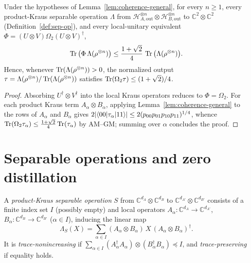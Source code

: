 \begin{theorem}
\label{thm:overlap-criterion}
\leanok
{}
Under the hypotheses of Lemma~\ref{lem:coherence-general}, for every $n\ge 1$, every product-Kraus separable operation $\Lambda$ from $\mathcal{H}_{A,\mathrm{out}}^{\otimes n}\otimes\mathcal{H}_{B,\mathrm{out}}^{\otimes n}$ to $\mathbb{C}^2\otimes\mathbb{C}^2$ (Definition~\ref{def:sep-op}), and every local-unitary equivalent $\Phi = (U\otimes V)\Omega_2(U\otimes V)^{\dagger}$,
\[
  \operatorname{Tr}\big(\Phi\,\Lambda(\rho^{\otimes n})\big)
  \le \frac{1+\sqrt{2}}{4}\,\operatorname{Tr}\big(\Lambda(\rho^{\otimes n})\big).
\]
Hence, whenever $\operatorname{Tr}(\Lambda(\rho^{\otimes n})) > 0$, the normalized output $\tau = \Lambda(\rho^{\otimes n})/\operatorname{Tr}(\Lambda(\rho^{\otimes n}))$ satisfies $\operatorname{Tr}(\Omega_2\tau) \le (1+\sqrt{2})/4$.
\end{theorem}
\begin{proof}
\leanok
Absorbing $U^{\dagger}\otimes V^{\dagger}$ into the local Kraus operators reduces to $\Phi = \Omega_2$. For each product Kraus term $A_\alpha\otimes B_\alpha$, applying Lemma~\ref{lem:coherence-general} to the rows of $A_\alpha$ and $B_\alpha$ gives $2|\langle 00|\tau_\alpha|11\rangle| \le 2(p_{00}p_{01}p_{10}p_{11})^{1/4}$, whence $\operatorname{Tr}(\Omega_2\tau_\alpha) \le \frac{1+\sqrt{2}}{4}\operatorname{Tr}(\tau_\alpha)$ by AM--GM; summing over $\alpha$ concludes the proof.
\end{proof}

\section{Separable operations and zero distillation}

\begin{definition}
\label{def:sep-op}
\leanok
A \emph{product-Kraus separable operation} $S$ from $\mathbb{C}^{d_A}\otimes\mathbb{C}^{d_B}$ to $\mathbb{C}^{d_{A'}}\otimes\mathbb{C}^{d_{B'}}$ consists of a finite index set $I$ (possibly empty) and local operators $A_\alpha : \mathbb{C}^{d_A}\to\mathbb{C}^{d_{A'}}$, $B_\alpha : \mathbb{C}^{d_B}\to\mathbb{C}^{d_{B'}}$ ($\alpha\in I$), inducing the linear map
\[
  \Lambda_S(X) = \sum_{\alpha\in I} (A_\alpha\otimes B_\alpha)\,X\,(A_\alpha\otimes B_\alpha)^{\dagger}.
\]
It is \emph{trace-nonincreasing} if $\sum_{\alpha\in I} (A_\alpha^{\dagger}A_\alpha)\otimes(B_\alpha^{\dagger}B_\alpha) \preceq I$, and \emph{trace-preserving} if equality holds.
\end{definition}

